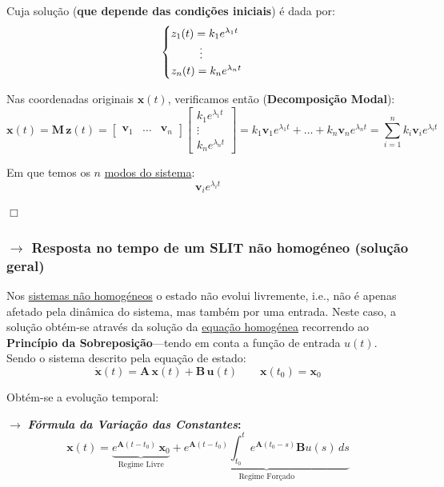 \noindent Cuja solução (\textbf{que depende das condições iniciais}) é dada por:
$$
    \begin{cases}
        z_1(t) = k_1 e^{\lambda_1 t}\\
        \mkern46mu \vdots\\
        z_n(t) = k_n e^{\lambda_n t}
    \end{cases}
$$

\noindent Nas coordenadas originais $\pmb{x}(t)$, verificamos então (\textbf{Decomposição Modal}):
$$
    \pmb{x}(t) = \pmb{M}\, \pmb{z}(t) = 
    \begin{bmatrix}
        \pmb{v}_1 & \hdots & \pmb{v}_n
    \end{bmatrix}
    \begin{bmatrix}
        k_1 e^{\lambda_1 t}\\
        \vdots\\
        k_n e^{\lambda_n t}
    \end{bmatrix}
    = k_1 \pmb{v}_1 e^{\lambda_1 t} + \dots + k_n \pmb{v}_n e^{\lambda_n t} = \sum_{i=1}^{n} k_i \pmb{v}_i e^{\lambda_i t}
$$

\noindent Em que temos os $n$ \underline{modos do sistema}:
$$
    \pmb{v}_i e^{\lambda_i t}
$$

\hfill\ensuremath{\Box}

\subsubsection[1.1.5 Resposta no tempo de um SLIT não homogéneo (solução geral)]{$\pmb{\rightarrow}$ Resposta no tempo de um SLIT não homogéneo (solução geral)}
\label{subsec:non-homogeneous-equation}

Nos \underline{sistemas não homogéneos} o estado não evolui livremente, i.e., não é apenas afetado pela dinâmica do sistema, mas também por uma entrada. Neste caso, a solução obtém-se através da solução da \hyperref[subsec:homogeneous-equation]{equação homogénea} recorrendo ao \textbf{Princípio da Sobreposição}---tendo em conta a função de entrada $u(t)$.
\\[6pt]
\noindent Sendo o sistema descrito pela equação de estado:
$$
    \dot{\pmb{x}}(t) = \pmb{A}\, \pmb{x}(t) + \pmb{B}\, \pmb{u}(t)\qquad \pmb{x}(t_0) = \pmb{x}_0
$$

\noindent Obtém-se a evolução temporal:
{

\begin{mdframed}
    \noindent $\pmb{\rightarrow}$ \textbf{\textit{Fórmula da Variação das Constantes}:}
    $$
        \pmb{x}(t) = \underbrace{e^{\pmb{A}(t-t_0)}\, \pmb{x}_0}_{\text{Regime Livre}} + \underbrace{e^{\pmb{A}(t-t_0)} \int_{t_0}^{t} e^{\pmb{A}(t_0-s)} \pmb{B} u(s)\, ds}_{\text{Regime Forçado}}
    $$
    
\end{mdframed}
}

